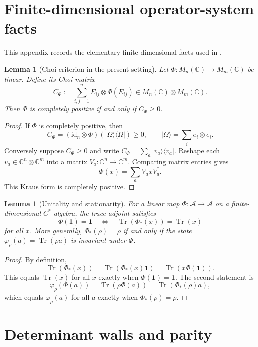 \documentclass[11pt]{article}
\newtheorem{lemma}[theorem]{Lemma}
\theoremstyle{definition}
\theoremstyle{remark}
\newcommand{\C}{\mathbb C}
\newcommand{\one}{\mathbf 1}
\newcommand{\id}{\mathrm{id}}
\newcommand{\Tr}{\operatorname{Tr}}
\newcommand{\A}{\mathcal A}
\begin{document}
\appendix

\section{Finite-dimensional operator-system facts}
\label{app:operator-systems}

This appendix records the elementary finite-dimensional facts used in
.

\begin{lemma}[Choi criterion in the present setting]
\label{lem:choi}
Let $\Phi:M_n(\C)\to M_m(\C)$ be linear.  Define its Choi matrix
\[
 C_\Phi:=\sum_{i,j=1}^{n}E_{ij}\otimes\Phi(E_{ij})
 \in M_n(\C)\otimes M_m(\C).
\]
Then $\Phi$ is completely positive if and only if $C_\Phi\ge0$.
\end{lemma}

\begin{proof}
If $\Phi$ is completely positive, then
\[
 C_\Phi=(\id_n\otimes\Phi)(|\Omega\rangle\langle\Omega|)\ge0,
 \qquad
 |\Omega\rangle=\sum_i e_i\otimes e_i.
\]
Conversely suppose $C_\Phi\ge0$ and write
$C_\Phi=\sum_a|v_a\rangle\langle v_a|$.  Reshape each
$v_a\in\C^n\otimes\C^m$ into a matrix $V_a:\C^n\to\C^m$.  Comparing matrix
entries gives
\[
 \Phi(x)=\sum_aV_axV_a^*.
\]
This Kraus form is completely positive.
\end{proof}

\begin{lemma}[Unitality and stationarity]
\label{lem:unital-stationary}
For a linear map $\Phi:\A\to\A$ on a finite-dimensional $C^*$-algebra, the
trace adjoint satisfies
\[
 \Phi(\one)=\one
 \quad\Longleftrightarrow\quad
 \Tr(\Phi_*(x))=\Tr(x)
\]
for all $x$.  More generally,
$\Phi_*(\rho)=\rho$ if and only if the state
$\varphi_\rho(a)=\Tr(\rho a)$ is invariant under $\Phi$.
\end{lemma}

\begin{proof}
By definition,
\[
 \Tr(\Phi_*(x))=\Tr(\Phi_*(x)\one)=\Tr(x\Phi(\one)).
\]
This equals $\Tr(x)$ for all $x$ exactly when $\Phi(\one)=\one$.  The second
statement is
\[
 \varphi_\rho(\Phi(a))
 =\Tr(\rho\Phi(a))
 =\Tr(\Phi_*(\rho)a),
\]
which equals $\varphi_\rho(a)$ for all $a$ exactly when
$\Phi_*(\rho)=\rho$.
\end{proof}

\section{Determinant walls and parity}
\label{app:determinant-walls}
\end{document}
